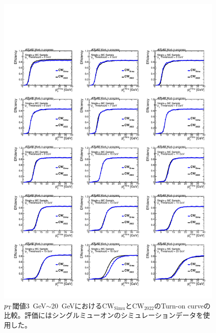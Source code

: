 \begin{figure}[p]
  \centering
  \includegraphics[clip, width=14cm]{fig/5/v05vsv07_MU3_20_re.pdf}
  \caption{$p_{\rm{T}}$閾値3~GeV$\sim$20~GeVにおける$\mathrm{CW_{Simu}}$と$\mathrm{CW_{2022}}$のTurn-on curveの比較。評価にはシングルミューオンのシミュレーションデータを使用した。}
  \label{fig:v05v07_1_9_Simu}
\end{figure}




